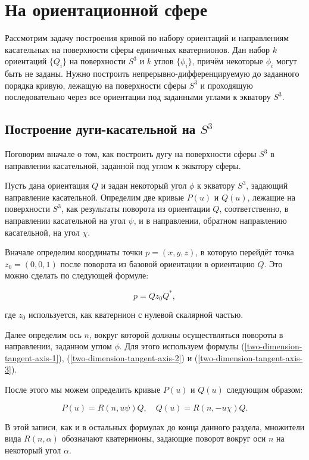 \section{На ориентационной сфере}

Рассмотрим задачу построения кривой по набору ориентаций и направлениям касательных на поверхности сферы единичных
кватернионов. Дан набор $k$ ориентаций $\{Q_i\}$ на поверхности $S^3$ и $k$ углов $\{\phi_i\}$, причём некоторые
$\phi_i$ могут быть не заданы. Нужно построить непрерывно-дифференцируемую до заданного порядка кривую, лежащую
на поверхности сферы $S^3$ и проходящую последовательно через все ориентации под заданными углами к экватору $S^3$.

\subsection*{Построение дуги-касательной на $S^3$}

Поговорим вначале о том, как построить дугу на поверхности сферы $S^3$ в направлении касательной, заданной под углом к
экватору сферы.

Пусть дана ориентация $Q$ и задан некоторый угол $\phi$ к экватору $S^3$, задающий направление касательной.
Определим две кривые $P(u)$ и $Q(u)$, лежащие на поверхности $S^3$, как результаты поворота из ориентации $Q$,
соответственно, в направлении касательной на угол $\psi$, и в направлении, обратном направлению касательной,
на угол $\chi$.

Вначале определим координаты точки $p=(x,y,z)$, в которую перейдёт точка $z_0=(0,0,1)$ после поворота из базовой
ориентации в ориентацию $Q$. Это можно сделать по следующей формуле:

$$
p=Qz_0Q^*,
$$

\noindent где $z_0$ используется, как кватернион с нулевой скалярной частью.

Далее определим ось $n$, вокруг которой должны осуществляться повороты в направлении, заданном углом $\phi$. Для этого
используем формулы (\ref{two-dimension-tangent-axis-1}), (\ref{two-dimension-tangent-axis-2}) и
(\ref{two-dimension-tangent-axis-3}).

После этого мы можем определить кривые $P(u)$ и $Q(u)$ следующим образом:

$$
P(u)=R(n,u\psi)Q, \quad Q(u)=R(n,-u\chi)Q.
$$

В этой записи, как и в остальных формулах до конца данного раздела, множители вида $R(n,\alpha)$ обозначают кватернионы,
задающие поворот вокруг оси $n$ на некоторый угол $\alpha$.

